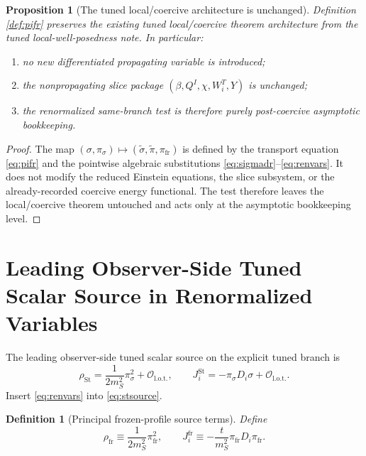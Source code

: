 \documentclass[11pt]{article}
\newtheorem{definition}{Definition}
\newtheorem{proposition}{Proposition}
\begin{document}
\begin{proposition}[The tuned local/coercive architecture is unchanged]
\label{prop:coercivepreserved}
Definition \ref{def:pifr} preserves the existing tuned local/coercive theorem architecture from the tuned local-well-posedness note. In particular:
\begin{enumerate}
    \item no new differentiated propagating variable is introduced;
    \item the nonpropagating slice package \((\beta,Q^I,\chi,W_i^T,Y)\) is unchanged;
    \item the renormalized same-branch test is therefore purely post-coercive asymptotic bookkeeping.
\end{enumerate}
\end{proposition}

\begin{proof}
The map \((\sigma,\pi_\sigma)\mapsto (\widetilde{\sigma},\widetilde{\pi},\pi_{\mathrm{fr}})\) is defined by the transport equation \eqref{eq:pifr} and the pointwise algebraic substitutions \eqref{eq:sigmadr}--\eqref{eq:renvars}. It does not modify the reduced Einstein equations, the slice subsystem, or the already-recorded coercive energy functional. The test therefore leaves the local/coercive theorem untouched and acts only at the asymptotic bookkeeping level.
\end{proof}

\section{Leading Observer-Side Tuned Scalar Source in Renormalized Variables}

The leading observer-side tuned scalar source on the explicit tuned branch is
\begin{equation}
\rho_{\mathrm{St}}
=
\frac{1}{2m_S^2}\pi_\sigma^2+\mathcal O_{\mathrm{l.o.t.}},
\qquad
J_i^{\mathrm{St}}
=
-\pi_\sigma D_i\sigma+\mathcal O_{\mathrm{l.o.t.}}.
\label{eq:stsource}
\end{equation}
Insert \eqref{eq:renvars} into \eqref{eq:stsource}.

\begin{definition}[Principal frozen-profile source terms]
\label{def:frozensource}
Define
\begin{equation}
\rho_{\mathrm{fr}}
\equiv
\frac{1}{2m_S^2}\pi_{\mathrm{fr}}^2,
\qquad
J_i^{\mathrm{fr}}
\equiv
-\frac{t}{m_S^2}\pi_{\mathrm{fr}}D_i\pi_{\mathrm{fr}}.
\label{eq:frozensource}
\end{equation}
\end{definition}
\end{document}
